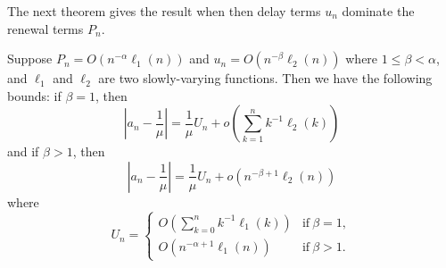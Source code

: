 The next theorem gives the result when then delay terms $u_n$ dominate the renewal terms $P_n$.
\begin{theorem}
    \label{theorem:main-beta-lt-alpha}
    Suppose $P_n = O(n^{-\alpha}\ell_1(n))$
    and $u_n = O(n^{-\beta}\ell_2(n))$
    where $1 \leq \beta < \alpha$,
    and $\ell_1$ and $\ell_2$ are two slowly-varying functions.
    Then we have the following bounds: if $\beta = 1$, then
    \[
        \left|a_n - \frac{1}{\mu}\right| = \frac{1}{\mu}U_n + o\left(\sum_{k=1}^n k^{-1}\ell_2(k)\right)
    \]
    and if $\beta > 1$, then
    \[
        \left|a_n - \frac{1}{\mu}\right| = \frac{1}{\mu} U_n + o(n^{-\beta+1}\ell_2(n))
    \]
    where
    \[
        U_n = \begin{cases}
            O\left(\sum_{k=0}^n k^{-1}\ell_1(k)\right)
                & \text{if}\ \beta = 1,\\
            O\left(n^{-\alpha + 1} \ell_1(n)\right)
                & \text{if}\ \beta > 1.
        \end{cases}
    \]
\end{theorem}
